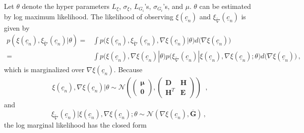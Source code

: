 Let $\theta$ denote the hyper parameters
$L_\xi$, $\sigma_\xi$, $L_{G_i}$'s, $\sigma_{G_i}$'s, and $\mu$.
$\theta$ can be estimated by log maximum likelihood. The likelihood of observing
$\xi(\underline{c}_n)$ 
and $\xi_{\tilde{\nabla}}(\underline{c}_n)$ is given by
\begin{equation}\begin{split}
    p\left(\xi(\underline{c}_n), \xi_{\tilde{\nabla}}(\underline{c}_n) |\theta \right) 
    =& \int p\big(\xi(\underline{c}_n), \xi_{\tilde{\nabla}}(\underline{c}_n) ,
              \nabla \xi(\underline{c}_n) | \theta\big) d\big(\nabla \xi(\underline{c}_n)\big)\\
    =& \int p\big(\xi(\underline{c}_n),\nabla\xi(\underline{c}_n) | \theta\big) 
      p\big( \xi_{\tilde{\nabla}}(\underline{c}_n) | \xi(\underline{c}_n),\nabla\xi(\underline{c}_n)
      ;\theta \big)
      d\big(\nabla \xi(\underline{c}_n)\big)\,,
    \label{eqn: marginal likelihood}
\end{split}\end{equation}
which is marginalized over $\nabla \xi(\underline{c}_n)$. Because
\begin{equation}\begin{split}
    \xi(\underline{c}_n),\nabla \xi(\underline{c}_n) \Big| \theta \sim \mathcal{N}\left(
        \begin{pmatrix}
            \boldsymbol{\mu}\\
            \boldsymbol{0}
        \end{pmatrix},
        \begin{pmatrix}
            \boldsymbol{D} & \boldsymbol{H} \\
            \boldsymbol{H}^T & \boldsymbol{E}
        \end{pmatrix}
    \right)
\end{split}\,,
\label{first term}
\end{equation}
and
\begin{equation}
    \xi_{\tilde{\nabla}}(\underline{c}_n) | \xi(\underline{c}_n),
    \nabla \xi(\underline{c}_n); \theta
    \sim 
    \mathcal{N} 
    \left(
            \nabla \xi(\underline{c}_n)
        ,
            \overline{\boldsymbol{G}}
    \right)\,,
\label{second term}
\end{equation}
the log marginal likelihood has the closed form
